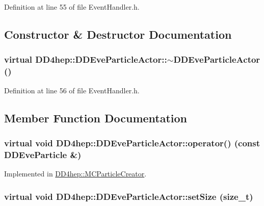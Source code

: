 Definition at line 55 of file EventHandler.h.

\subsection{Constructor \& Destructor Documentation}
\hypertarget{struct_d_d4hep_1_1_d_d_eve_particle_actor_a98cc089b4106ef7c3e468ced02532917}{
\subsubsection[{$\sim$DDEveParticleActor}]{\setlength{\rightskip}{0pt plus 5cm}virtual DD4hep::DDEveParticleActor::$\sim$DDEveParticleActor ()}}
\label{struct_d_d4hep_1_1_d_d_eve_particle_actor_a98cc089b4106ef7c3e468ced02532917}


Definition at line 56 of file EventHandler.h.

\subsection{Member Function Documentation}
\hypertarget{struct_d_d4hep_1_1_d_d_eve_particle_actor_a27707fecbdb50e7566ec01c784fcc669}{
\subsubsection[{operator()}]{\setlength{\rightskip}{0pt plus 5cm}virtual void DD4hep::DDEveParticleActor::operator() (const {\bf DDEveParticle} \&)}}
\label{struct_d_d4hep_1_1_d_d_eve_particle_actor_a27707fecbdb50e7566ec01c784fcc669}


Implemented in \hyperlink{struct_d_d4hep_1_1_m_c_particle_creator_a42ebf0f3d55a5f02d9617ccf7aaf550a}{DD4hep::MCParticleCreator}.\hypertarget{struct_d_d4hep_1_1_d_d_eve_particle_actor_ac272c9587190181a943894d5983b1ac9}{
\subsubsection[{setSize}]{\setlength{\rightskip}{0pt plus 5cm}virtual void DD4hep::DDEveParticleActor::setSize (size\_\-t)}}
\label{struct_d_d4hep_1_1_d_d_eve_particle_actor_ac272c9587190181a943894d5983b1ac9}


